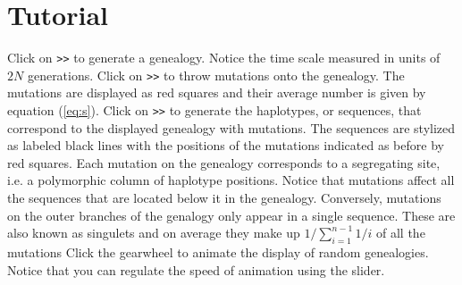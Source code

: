 \section{Tutorial}
\begin{enumerate}
  \I Click on \texttt{>>} to generate a genealogy. Notice the time
  scale measured in units of $2N$ generations.
  \I Click on \texttt{>>} to throw mutations  onto the
  genealogy. The mutations are displayed as red squares and their average number is given by equation
  (\ref{eq:s}).
  \I Click on \texttt{>>} to generate the haplotypes, or sequences,
  that correspond to the displayed genealogy with mutations. The
  sequences are stylized as labeled black lines with the positions of
  the 
  mutations indicated as before by red squares. Each mutation on the
  genealogy corresponds to a segregating site, i.e. a polymorphic
  column of haplotype positions. Notice that mutations affect all the
  sequences that are located below it in 
  the genealogy. Conversely, mutations on the outer branches of the
  genalogy only appear in a single sequence. These are also
  known as singulets and on average they make up $1/\sum_{i=1}^{n-1}1/i$
  of all the mutations \cite{nor01:coa}
  \I Click the gearwheel to animate the display of random
  genealogies. Notice that you can regulate the speed of animation
  using the  slider.
\end{enumerate}





